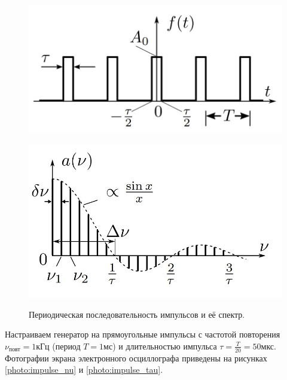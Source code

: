 \documentclass[12pt,a4paper]{article}
\begin{document}
\begin{figure}[H]
	\centering
	\begin{minipage}[b]{.49\textwidth}
		\centering
		\includegraphics[width=0.9\linewidth]{"res/impulse"}
		\caption{Периодическая последовательность импульсов и её спектр.}
		\label{res:impulse}
	\end{minipage}%
	\begin{minipage}[b]{.49\textwidth}
		\centering
		\includegraphics[width=0.9\linewidth]{"res/impulse_spectrum"}
		\label{res:impulse_spectrum}
	\end{minipage}
\end{figure}

Настраиваем генератор на прямоугольные импульсы с частотой повторения $\nu_{\text{повт}} = 1 \text{кГц}$ (период $T = 1 \text{мс}$) и длительностью импульса $\tau = \frac{T}{20} = 50 \text{мкс}$. Фотографии экрана электронного осциллографа приведены на рисунках \ref{photo:impulse_nu} и \ref{photo:impulse_tau}. 
\end{document}
